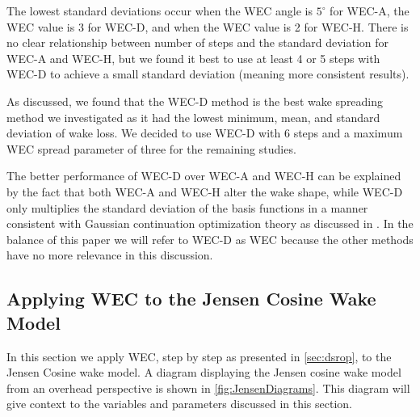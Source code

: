 \documentclass[a4paper]{jpconf}
\begin{document}
The lowest standard deviations occur when the WEC angle is $5^\circ$ for WEC-A, the WEC value is 3 for WEC-D, and when the WEC value is 2 for WEC-H. There is no clear relationship between number of steps and the standard deviation for WEC-A and WEC-H, but we found it best to use at least 4 or 5 steps with WEC-D to achieve a small standard deviation (meaning more consistent results).


 As discussed, we found that the WEC-D method is the best wake spreading method we investigated as it had the lowest minimum, mean, and standard deviation of wake loss. We decided to use WEC-D with 6 steps and a maximum WEC spread parameter of three for the remaining studies.
 
 The better performance of WEC-D over WEC-A and WEC-H can be explained by the fact that both WEC-A and WEC-H alter the wake shape, while WEC-D only multiplies the standard deviation of the basis functions in a manner consistent with Gaussian continuation optimization theory as discussed in \cite{mobahi2015}. In the balance of this paper we will refer to WEC-D as WEC because the other methods have no more relevance in this discussion. 
 
\subsection{Applying WEC to the Jensen Cosine Wake Model}
In this section we apply WEC, step by step as presented in \cref{sec:dsrop}, to the Jensen Cosine wake model. A diagram displaying the Jensen cosine wake model from an overhead perspective is shown in  \cref{fig:JensenDiagrams}. This diagram will give context to the variables and parameters discussed in this section.
\end{document}
